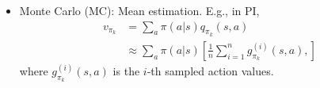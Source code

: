 \begin{frame}
    \begin{itemize}
        \begin{block}{Law of Large Numbers, LLN}
            For a random variable $X$, suppose that $\{x_{i}\}_{i=1}^{n}$ are some i.i.d. samples. 
            $\bar{x}$ is an unbiased estimate of $\mathbb{E}[X]$, and its variance decreases to 0 as $n$ increases to $\infty$.
        \end{block}
        \item Monte Carlo (MC): Mean estimation. E.g., in PI, 
        \begin{align*}
            v_{\pi_k} &= \sum_{a}\pi(a|s)q_{\pi_k}(s,a)\\
            &\approx \sum_{a}\pi(a|s)\left[ 
                \frac{1}{n}\sum_{i=1}^n g_{\pi_k}^{(i)}(s,a),
            \right]
        \end{align*}
        where $g_{\pi_k}^{(i)}(s,a)$ is the $i$-th sampled action values.
    \end{itemize}
\end{frame}
